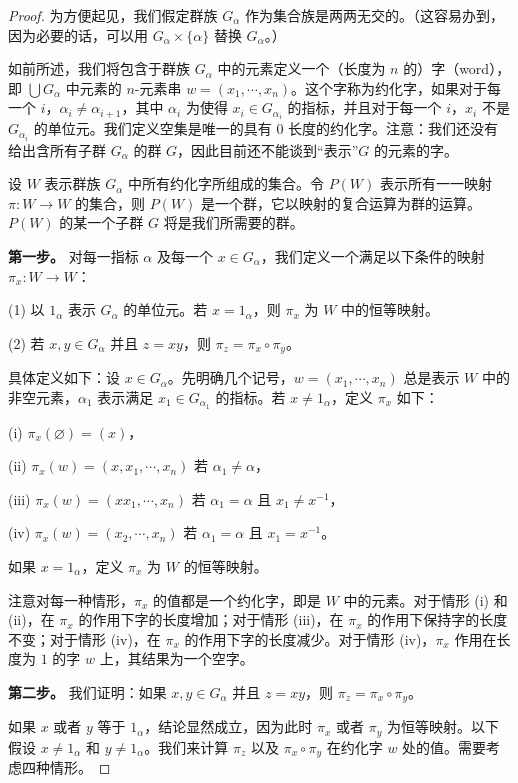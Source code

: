 \documentclass[../../main.tex]{subfiles}
\begin{document}
\begin{proof}
为方便起见，我们假定群族 $G_\alpha$ 作为集合族是两两无交的。（这容易办到，因为必要的话，可以用 $G_\alpha\times\{\alpha\}$ 替换 $G_\alpha$。）

如前所述，我们将包含于群族 $G_\alpha$ 中的元素定义一个（长度为 $n$ 的）字（word），即 $\bigcup G_\alpha$ 中元素的 $n$-元素串 $w=(x_1,\cdots,x_n)$。这个字称为约化字，如果对于每一个 $i$，$\alpha_i\neq\alpha_{i+1}$，其中 $\alpha_i$ 为使得 $x_i\in G_{\alpha_i}$ 的指标，并且对于每一个 $i$，$x_i$ 不是 $G_{\alpha_i}$ 的单位元。我们定义空集是唯一的具有 $0$ 长度的约化字。注意：我们还没有给出含所有子群 $G_\alpha$ 的群 $G$，因此目前还不能谈到“表示”$G$ 的元素的字。

设 $W$ 表示群族 $G_\alpha$ 中所有约化字所组成的集合。令 $P(W)$ 表示所有一一映射 $\pi:W\to W$ 的集合，则 $P(W)$ 是一个群，它以映射的复合运算为群的运算。$P(W)$ 的某一个子群 $G$ 将是我们所需要的群。

\textbf{第一步。} 对每一指标 $\alpha$ 及每一个 $x\in G_\alpha$，我们定义一个满足以下条件的映射 $\pi_x:W\to W$：

(1) 以 $1_\alpha$ 表示 $G_\alpha$ 的单位元。若 $x=1_\alpha$，则 $\pi_x$ 为 $W$ 中的恒等映射。

(2) 若 $x,y\in G_\alpha$ 并且 $z=xy$，则 $\pi_z=\pi_x\circ\pi_y$。

具体定义如下：设 $x\in G_\alpha$。先明确几个记号，$w=(x_1,\cdots,x_n)$ 总是表示 $W$ 中的非空元素，$\alpha_1$ 表示满足 $x_1\in G_{\alpha_1}$ 的指标。若 $x\neq 1_\alpha$，定义 $\pi_x$ 如下：

(i) $\pi_x(\varnothing)=(x)$，

(ii) $\pi_x(w)=(x,x_1,\cdots,x_n)$ 若 $\alpha_1\neq\alpha$，

(iii) $\pi_x(w)=(xx_1,\cdots,x_n)$ 若 $\alpha_1=\alpha$ 且 $x_1\neq x^{-1}$，

(iv) $\pi_x(w)=(x_2,\cdots,x_n)$ 若 $\alpha_1=\alpha$ 且 $x_1=x^{-1}$。

如果 $x=1_\alpha$，定义 $\pi_x$ 为 $W$ 的恒等映射。

注意对每一种情形，$\pi_x$ 的值都是一个约化字，即是 $W$ 中的元素。对于情形 (i) 和 (ii)，在 $\pi_x$ 的作用下字的长度增加；对于情形 (iii)，在 $\pi_x$ 的作用下保持字的长度不变；对于情形 (iv)，在 $\pi_x$ 的作用下字的长度减少。对于情形 (iv)，$\pi_x$ 作用在长度为 $1$ 的字 $w$ 上，其结果为一个空字。

\textbf{第二步。} 我们证明：如果 $x,y\in G_\alpha$ 并且 $z=xy$，则 $\pi_z=\pi_x\circ\pi_y$。

如果 $x$ 或者 $y$ 等于 $1_\alpha$，结论显然成立，因为此时 $\pi_x$ 或者 $\pi_y$ 为恒等映射。以下假设 $x\neq 1_\alpha$ 和 $y\neq 1_\alpha$。我们来计算 $\pi_z$ 以及 $\pi_x\circ\pi_y$ 在约化字 $w$ 处的值。需要考虑四种情形。


\end{proof}
\end{document}
